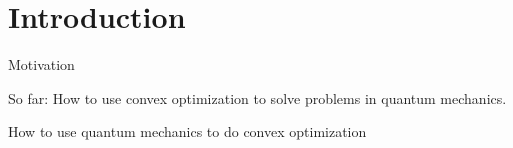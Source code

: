 \section*{Introduction}

\begin{frame}{Motivation}
 
\alert{So far:} How to use convex optimization to solve problems in quantum mechanics.

\vspace{4\floatsep}\pause

 How to use quantum mechanics to do convex optimization 

% 
% 
% 

\end{frame}
